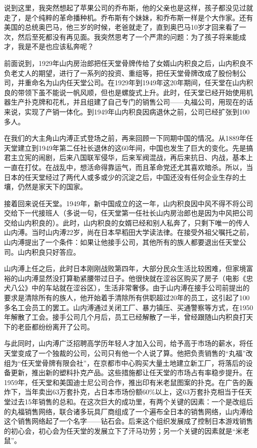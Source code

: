 \documentclass[
  letterpaper,
  DIV=11,
  numbers=noendperiod]{scrreprt}
\begin{document}
说到这里，我突然想起了苹果公司的乔布斯，他的父亲也是这样，孩子都没见过就走了，是个纯粹的革命播种机。乔布斯有个妹妹，和乔布斯一样是个大作家。还有美国的总统奥巴马，他三岁的时候，老爸就走了，直到奥巴马10岁才回来看了一次，然后至死都没有再见面。我突然思考了一个严肃的问题：为了孩子将来能成才，我是不是也应该私奔呢？

前面说到，1929年山内房治郎把任天堂骨牌传给了女婿山内积良之后，山内积良不负老丈人的期望，进行了一系列的投资、重组等，把任天堂骨牌改成了股份制公司，并重命名为山内任天堂公司。在1929年到1949年这20年期间，任天堂在山内积良的带领下虽不能说一帆风顺，但也是螺旋式上升。此时，任天堂已经开始使用机器生产扑克牌和花札，并且组建了自己专门的销售公司------丸福公司，用现在的话来说，实现了产销一体化。到1949年山内积良因病退休之前，公司已经扩张到100多人。

在我们的大主角山内溥正式登场之前，再来回顾一下同期中国的情况。从1889年任天堂建立到1949年第二任社长退休的这60年间，中国也发生了巨大的变化。先是搞君主立宪的闹剧，后来八国联军侵华，后来军阀混战，再后来抗日、内战，基本上一直在打仗。在战乱中，想活命得靠运气，而且革命党还尤其喜欢暗杀。所以，当日本的任天堂经过了两代人或多或少的沉淀之后，中国还没有任何企业生存的土壤，仍然是家天下的国家。

接着回来说任天堂。1949年，新中国成立的这一年，山内积良因中风不得不将公司交给下一代接班人（多说一句，任天堂第一任社长山内房治郎也是因为中风把公司交给山内积良的）。此时，山内积良的女婿已经和别人私奔了，只剩下唯一的传人山内溥。当时山内溥22岁，尚在日本早稻田大学读法律。在接受外祖父嘱托之前，山内溥提出了一个条件：如果让他接手公司，其他所有的族人都要退出任天堂公司。山内积良只好答应。

山内溥上任之后，此时日本刚刚战败第四年，大部分民众生活比较困难，但家境富裕的山内溥显然没打算勒紧腰带过日子。他很快就在涩谷区购买了房子（电影《忠犬八公》中的车站就在涩谷区），生活非常奢侈。由于山内溥在接手公司前提出的要求是清除所有的族人，他开始着手清除所有供职超过20年的员工，这引起了100多名工会员工的罢工。山内溥通过关闭工厂、暴力镇压、买通警察等方式，在1950年解散了工会。接手公司几个月后，员工已经解散了一半，曾经跟随山内积良打天下的老臣都纷纷离开了公司。

与此同时，山内溥广泛招聘高学历年轻人才加入公司，给予高于市场的薪水，将任天堂变成了一个独裁的公司，公司只有他一个人说了算。他把负责销售的``丸福''改组为``任天堂骨牌有限会社''，在京都市中心购买大量土地建立新工厂，将落后的设备更新，推出新的塑料扑克产品。这些措施都让任天堂的市场占有率稳步提升。在1959年，任天堂和美国迪士尼公司合作，推出印有米老鼠图案的扑克。在广告的轰炸下，当年卖出63万套扑克，占日本市场份额60\%以上，这63万套扑克相当于任天堂过去15年销售的总和。在这次巨大的成功里，有两个关键的因素：一个是改组后的丸福销售网络，联合诸多玩具厂商组成了一个遍布全日本的销售网络，山内溥给这个销售网络起了一个名字------钻石会。后来这个组织发展成了控制日本游戏销售的初心会，初心会为任天堂的发展立下了汗马功劳；另一个关键的因素就是``米老鼠''。
\end{document}
